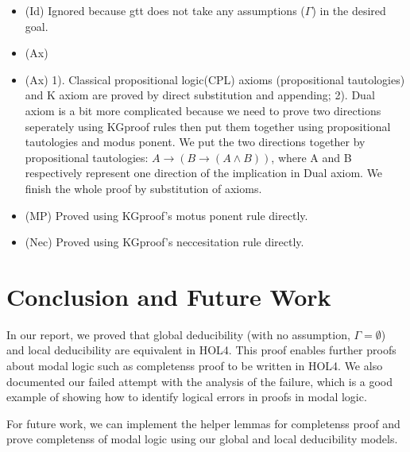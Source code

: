 \documentclass[submission,copyright,creativecommons]{eptcs}
\begin{document}
\begin{itemize}
  \item (Id) Ignored because gtt does not take any assumptions ($\Gamma$) in the desired goal.  \item (Ax)
  \item (Ax) 1). Classical propositional logic(CPL) axioms (propositional tautologies) and K axiom are proved by 
  direct substitution and appending; 2). Dual axiom is a bit more complicated because we need to prove 
  two directions seperately using KGproof rules then put them together using propositional tautologies and 
  modus ponent. We put the two directions together by propositional tautologies:
  $A\rightarrow (B \rightarrow (A \wedge B))$, where A and B respectively represent 
  one direction of the implication in Dual axiom. We finish the whole proof by substitution of axioms. 
  \item (MP) Proved using KGproof's motus ponent rule directly.
  \item (Nec) Proved using KGproof's neccesitation rule directly.
\end{itemize}


\section{Conclusion and Future Work}
In our report, we proved that global deducibility (with no assumption, $\Gamma = \emptyset$) 
and local deducibility are equivalent in HOL4. 
This proof enables further proofs about modal logic such as completenss proof 
to be written in HOL4. 
We also documented our failed attempt with the analysis of the failure, which 
is a good example of showing how to identify logical errors in proofs in modal logic. 

For future work, we can implement the helper lemmas for completenss proof 
and prove completenss of modal logic using our global and local deducibility 
models. 




\end{document}
